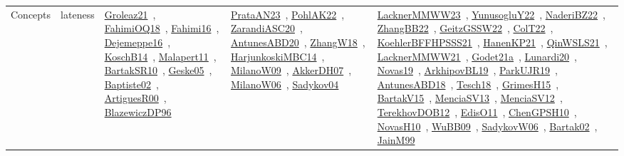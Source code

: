 {\begin{longtable}{lp{3cm}>{\raggedright\arraybackslash}p{6cm}>{\raggedright\arraybackslash}p{6cm}>{\raggedright\arraybackslash}p{8cm}}
Concepts & lateness & \href{works/Groleaz21.pdf}{Groleaz21}~\cite{Groleaz21}, \href{works/FahimiOQ18.pdf}{FahimiOQ18}~\cite{FahimiOQ18}, \href{works/Fahimi16.pdf}{Fahimi16}~\cite{Fahimi16}, \href{works/Dejemeppe16.pdf}{Dejemeppe16}~\cite{Dejemeppe16}, \href{works/KoschB14.pdf}{KoschB14}~\cite{KoschB14}, \href{works/Malapert11.pdf}{Malapert11}~\cite{Malapert11}, \href{works/BartakSR10.pdf}{BartakSR10}~\cite{BartakSR10}, \href{works/Geske05.pdf}{Geske05}~\cite{Geske05}, \href{works/Baptiste02.pdf}{Baptiste02}~\cite{Baptiste02}, \href{works/ArtiguesR00.pdf}{ArtiguesR00}~\cite{ArtiguesR00}, \href{works/BlazewiczDP96.pdf}{BlazewiczDP96}~\cite{BlazewiczDP96} & \href{works/PrataAN23.pdf}{PrataAN23}~\cite{PrataAN23}, \href{works/PohlAK22.pdf}{PohlAK22}~\cite{PohlAK22}, \href{works/ZarandiASC20.pdf}{ZarandiASC20}~\cite{ZarandiASC20}, \href{works/AntunesABD20.pdf}{AntunesABD20}~\cite{AntunesABD20}, \href{works/ZhangW18.pdf}{ZhangW18}~\cite{ZhangW18}, \href{works/HarjunkoskiMBC14.pdf}{HarjunkoskiMBC14}~\cite{HarjunkoskiMBC14}, \href{works/MilanoW09.pdf}{MilanoW09}~\cite{MilanoW09}, \href{works/AkkerDH07.pdf}{AkkerDH07}~\cite{AkkerDH07}, \href{works/MilanoW06.pdf}{MilanoW06}~\cite{MilanoW06}, \href{works/Sadykov04.pdf}{Sadykov04}~\cite{Sadykov04} & \href{works/LacknerMMWW23.pdf}{LacknerMMWW23}~\cite{LacknerMMWW23}, \href{works/YunusogluY22.pdf}{YunusogluY22}~\cite{YunusogluY22}, \href{works/NaderiBZ22.pdf}{NaderiBZ22}~\cite{NaderiBZ22}, \href{works/ZhangBB22.pdf}{ZhangBB22}~\cite{ZhangBB22}, \href{works/GeitzGSSW22.pdf}{GeitzGSSW22}~\cite{GeitzGSSW22}, \href{works/ColT22.pdf}{ColT22}~\cite{ColT22}, \href{works/KoehlerBFFHPSSS21.pdf}{KoehlerBFFHPSSS21}~\cite{KoehlerBFFHPSSS21}, \href{works/HanenKP21.pdf}{HanenKP21}~\cite{HanenKP21}, \href{works/QinWSLS21.pdf}{QinWSLS21}~\cite{QinWSLS21}, \href{works/LacknerMMWW21.pdf}{LacknerMMWW21}~\cite{LacknerMMWW21}, \href{works/Godet21a.pdf}{Godet21a}~\cite{Godet21a}, \href{works/Lunardi20.pdf}{Lunardi20}~\cite{Lunardi20}, \href{works/Novas19.pdf}{Novas19}~\cite{Novas19}, \href{works/ArkhipovBL19.pdf}{ArkhipovBL19}~\cite{ArkhipovBL19}, \href{works/ParkUJR19.pdf}{ParkUJR19}~\cite{ParkUJR19}, \href{works/AntunesABD18.pdf}{AntunesABD18}~\cite{AntunesABD18}, \href{works/Tesch18.pdf}{Tesch18}~\cite{Tesch18}, \href{works/GrimesH15.pdf}{GrimesH15}~\cite{GrimesH15}, \href{works/BartakV15.pdf}{BartakV15}~\cite{BartakV15}, \href{works/MenciaSV13.pdf}{MenciaSV13}~\cite{MenciaSV13}, \href{works/MenciaSV12.pdf}{MenciaSV12}~\cite{MenciaSV12}, \href{works/TerekhovDOB12.pdf}{TerekhovDOB12}~\cite{TerekhovDOB12}, \href{works/EdisO11.pdf}{EdisO11}~\cite{EdisO11}, \href{works/ChenGPSH10.pdf}{ChenGPSH10}~\cite{ChenGPSH10}, \href{works/NovasH10.pdf}{NovasH10}~\cite{NovasH10}, \href{works/WuBB09.pdf}{WuBB09}~\cite{WuBB09}, \href{works/SadykovW06.pdf}{SadykovW06}~\cite{SadykovW06}, \href{works/Bartak02.pdf}{Bartak02}~\cite{Bartak02}, \href{works/JainM99.pdf}{JainM99}~\cite{JainM99}\\

\end{longtable}}
